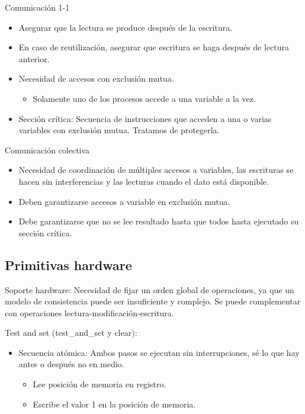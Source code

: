 \documentclass[12pt, twoside, openright]{report} %
\begin{document}
  
  
    Comunicación 1-1

    \begin{itemize}
    
    \item
      Asegurar que la lectura se produce después de la escritura.
    \item
      En caso de reutilización, asegurar que escritura se haga después
      de lectura anterior.
    \item
      Necesidad de accesos con exclusión mutua.

      \begin{itemize}
      
      \item
        Solamente uno de los procesos accede a una variable a la vez.
      \end{itemize}
    \item
      Sección crítica: Secuencia de instrucciones que acceden a una o
      varias variables con exclusión mutua. Tratamos de protegerla.
    \end{itemize}

    Comunicación colectiva

    \begin{itemize}
    
    \item
      Necesidad de coordinación de múltiples accesos a variables, las
      escrituras se hacen sin interferencias y las lecturas cuando el
      dato está disponible.
    \item
      Deben garantizarse accesos a variable en exclusión mutua.
    \item
      Debe garantizarse que no se lee resultado hasta que todos hasta
      ejecutado su sección crítica.
    \end{itemize}

\subsection{Primitivas hardware}



    Soporte hardware: Necesidad de fijar un orden global de
    operaciones, ya que un modelo de consistencia puede ser
    insuficiente y complejo. Se puede complementar con operaciones
    lectura-modificación-escritura.

    Test and set (test\_and\_set y clear):

    \begin{itemize}
    
    \item
      Secuencia atómica: Ambos pasos se ejecutan sin interrupciones,
      sé lo que hay antes o después no en medio.

      \begin{itemize}
      
      \item
        Lee posición de memoria en registro.
      \item
        Escribe el valor 1 en la posición de memoria.
      \end{itemize}
    \end{itemize}
\end{document}
